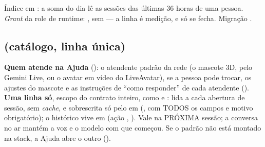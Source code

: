 Índice  em
: a soma do dia lê as sessões das últimas 36 horas
de uma pessoa. \emph{Grant} da role de runtime: , sem
 --- a linha é medição, e só se fecha. Migração
.

\subsection{ (catálogo, linha única)}

\textbf{Quem atende na Ajuda} (): o atendente padrão da rede (o
mascote 3D, pelo Gemini Live, ou o avatar em vídeo do LiveAvatar), se a pessoa
pode trocar, os ajustes do mascote e as instruções de \enquote{como responder}
de cada atendente (). \textbf{Uma linha só}, escopo do contrato
inteiro, como  e : lida a cada abertura de
sessão, sem \emph{cache}, e sobrescrita só pelo  em
 (, com
TODOS os campos e motivo obrigatório); o histórico vive em
 (ação , 
). Vale na PRÓXIMA sessão; a conversa no ar mantém a voz
e o modelo com que começou. Se o padrão não está montado na stack, a Ajuda abre
o outro ().


